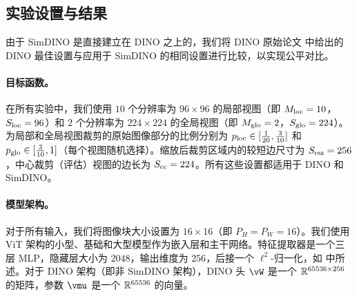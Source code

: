 \documentclass[../../book-main.tex]{subfiles}
\begin{document}
\subsection{实验设置与结果} \label{sub:contrastive_learning_experiment_results}

由于 SimDINO 是直接建立在 DINO 之上的，我们将 DINO 原始论文 \citep{caron2021emerging} 中给出的 DINO 最佳设置与应用于 SimDINO 的相同设置进行比较，以实现公平对比。

\paragraph{目标函数。} 在所有实验中，我们使用 \(10\) 个分辨率为 \(96 \times 96\) 的局部视图（即 \(M_{\mathrm{loc}} = 10\)，\(S_{\mathrm{loc}} = 96\)）和 \(2\) 个分辨率为 \(224 \times 224\) 的全局视图（即 \(M_{\mathrm{glo}} = 2\)，\(S_{\mathrm{glo}} = 224\)）。为局部和全局视图裁剪的原始图像部分的比例分别为 \(p_{\mathrm{loc}} \in [\frac{1}{20}, \frac{3}{10}]\) 和 \(p_{\mathrm{glo}} \in [\frac{3}{10}, 1]\)（每个视图随机选择）。缩放后裁剪区域内的较短边尺寸为 \(S_{\mathrm{rsz}} = 256\)，中心裁剪（评估）视图的边长为 \(S_{\mathrm{cc}} = 224\)。所有这些设置都适用于 DINO 和 SimDINO。

\paragraph{模型架构。} 对于所有输入，我们将图像块大小设置为 \(16 \times 16\)（即 \(P_{H} = P_{W} = 16\)）。我们使用 ViT \citep{dosovitskiy2020image} 架构的小型、基础和大型模型作为嵌入层和主干网络。特征提取器是一个三层 MLP，隐藏层大小为 \(2048\)，输出维度为 \(256\)，后接一个 \(\ell^{2}\)-归一化，如  中所述。对于 DINO 架构（即非 SimDINO 架构），DINO 头 \(\vW\) 是一个 \(\mathbb{R}^{65536 \times 256}\) 的矩阵，参数 \(\vmu\) 是一个 \(\mathbb{R}^{65536}\) 的向量。
\end{document}
